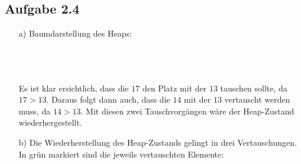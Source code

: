 \documentclass{article}
\begin{document}
    \subsection*{Aufgabe 2.4}
    \begin{enumerate}
        \item[a)] Baumdarstellung des Heaps:\\\\
        \\\\
        Es ist klar ersichtlich, dass die $17$ den Platz mit der $13$ tauschen sollte, da $17>13$. Daraus folgt dann auch, dass die $14$ mit der $13$ vertauscht werden muss, da $14>13$. Mit diesen zwei Tauschvorgängen wäre der Heap-Zustand wiederhergestellt. 
        \item[b)] Die Wiederherstellung des Heap-Zustands gelingt in drei Vertauschungen. In grün markiert sind die jeweils vertauschten Elemente:\\\\
        \begin{minipage}[t]{0.05\textwidth}
            \vspace*{-2cm}
            $\:$
        \end{minipage} 
        \begin{minipage}[t]{0.4\textwidth}
        \end{minipage}

\end{enumerate}
\end{document}
